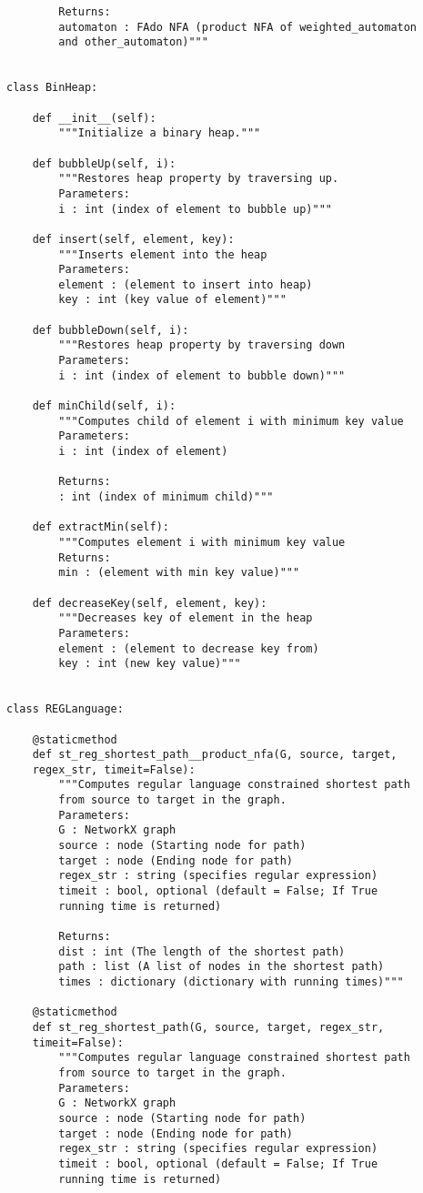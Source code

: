 \documentclass[]{article}
\numberwithin{equation}{section}
\begin{document}
\begin{appendices}
\begin{lstlisting}
		Returns:
		automaton : FAdo NFA (product NFA of weighted_automaton
		and	other_automaton)"""


class BinHeap:

	def __init__(self):
		"""Initialize a binary heap."""
	
	def bubbleUp(self, i):
		"""Restores heap property by traversing up.
		Parameters:
		i : int (index of element to bubble up)"""
	
	def insert(self, element, key):
		"""Inserts element into the heap
		Parameters:
		element : (element to insert into heap)
		key : int (key value of element)"""
	
	def bubbleDown(self, i):
		"""Restores heap property by traversing down
		Parameters:
		i : int (index of element to bubble down)"""
	
	def minChild(self, i):
		"""Computes child of element i with minimum key value
		Parameters:
		i : int (index of element)
		
		Returns:
		: int (index of minimum child)"""
	
	def extractMin(self):
		"""Computes element i with minimum key value
		Returns:
		min : (element with min key value)"""
	
	def decreaseKey(self, element, key):
		"""Decreases key of element in the heap
		Parameters:
		element : (element to decrease key from)
		key : int (new key value)"""


class REGLanguage:

	@staticmethod
	def st_reg_shortest_path__product_nfa(G, source, target,
	regex_str, timeit=False):
		"""Computes regular language constrained shortest path
		from source	to target in the graph.
		Parameters:
		G : NetworkX graph
		source : node (Starting node for path)
		target : node (Ending node for path)
		regex_str : string (specifies regular expression)
		timeit : bool, optional (default = False; If True
		running time is returned)
		
		Returns:
		dist : int (The length of the shortest path)
		path : list (A list of nodes in the shortest path)
		times : dictionary (dictionary with running times)"""
	
	@staticmethod
	def st_reg_shortest_path(G, source, target, regex_str,
	timeit=False):
		"""Computes regular language constrained shortest path
		from source	to target in the graph.
		Parameters:
		G : NetworkX graph
		source : node (Starting node for path)
		target : node (Ending node for path)
		regex_str : string (specifies regular expression)
		timeit : bool, optional (default = False; If True
		running	time is returned)
		

\end{lstlisting}
\end{appendices}
\end{document}
